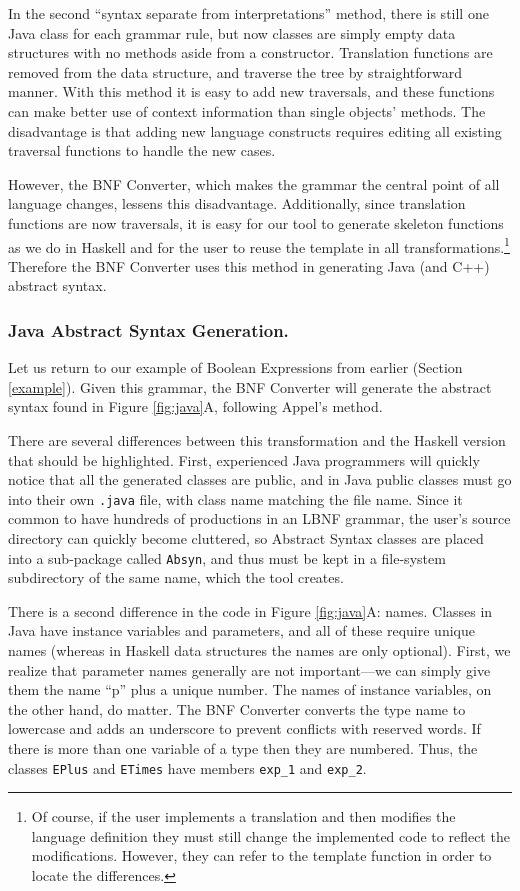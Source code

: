\documentclass{llncs}
\newcommand{\shortsection}[1]{\subsubsection*{#1.}} %
\begin{document}
In the second ``syntax separate from interpretations'' method, there is still one Java class for each grammar rule, but now classes are simply empty data structures with no methods aside from a constructor. Translation functions are removed from the data structure, and traverse the tree by straightforward manner. With this method it is easy to add new traversals, and these functions can make better use of context information than single objects' methods. The disadvantage is that adding new language constructs requires editing all existing traversal functions to handle the new cases.

However, the BNF Converter, which makes the grammar the central point of all language changes, lessens this disadvantage.  Additionally, since translation functions are now traversals, it is easy for our tool to generate skeleton functions as we do in Haskell and for the user to reuse the template in all transformations.\footnote{Of course, if the user implements a translation and then modifies the language definition they must still change the implemented code to reflect the modifications. However, they can refer to the template function in order to locate the differences.} Therefore the BNF Converter uses this method in generating Java (and C++) abstract syntax.

\shortsection{Java Abstract Syntax Generation}

Let us return to our example of Boolean Expressions from earlier (Section \ref{example}). Given this grammar, the BNF Converter will generate the abstract syntax found in Figure \ref{fig:java}A, following Appel's method.

There are several differences between this transformation and the Haskell version that should be highlighted. First, experienced Java programmers will quickly notice that all the generated classes are public, and in Java public classes must go into their own \texttt{.java} file, with class name matching the file name. Since it common to have hundreds of productions in an LBNF grammar, the user's source directory can quickly become cluttered, so Abstract Syntax classes are placed into a sub-package called {\tt Absyn}, and thus must be kept in a file-system subdirectory of the same name, which the tool creates.

There is a second difference in the code in Figure \ref{fig:java}A: names. Classes in Java have instance variables and parameters, and all of these require unique names (whereas in Haskell data structures the names are only optional). First, we realize that parameter names generally are not important---we can simply give them the name ``p'' plus a unique number. The names of instance variables, on the other hand, do matter. The BNF Converter converts the type name to lowercase and adds an underscore to prevent conflicts with reserved words. If there is more than one variable of a type then they are numbered. Thus, the classes \texttt{EPlus} and \texttt{ETimes} have members \texttt{exp\_1} and \texttt{exp\_2}.
\end{document}
